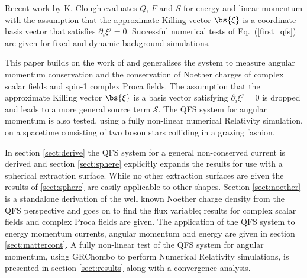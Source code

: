 Recent work by K. Clough \cite{clough2021continuity} evaluates $Q$, $F$ and $S$ for energy and linear momentum with the assumption that the approximate Killing vector $\bs{\xi}$ is a coordinate basis vector that satisfies ${\partial_i \xi^j} =0$. Successful numerical tests of Eq.~(\ref{first_qfs}) are given for fixed and dynamic background simulations.

This paper builds on the work of \cite{clough2021continuity} and generalises the system to measure angular momentum conservation and the conservation of Noether charges of complex scalar fields and spin-1 complex Proca fields. The assumption that the approximate Killing vector $\bs{\xi}$ is a basis vector satisfying $\partial_i \xi^j = 0$ is dropped and leads to a more general source term $\mathcal{S}$. The QFS system for angular momentum is also tested, using a fully non-linear numerical Relativity simulation, on a spacetime consisting of two boson stars colliding in a grazing fashion.

In section \ref{sect:derive} the QFS system for a general non-conserved current is derived and section \ref{sect:sphere} explicitly expands the results for use with a spherical extraction surface. While no other extraction surfaces are given the results of \ref{sect:sphere} are easily applicable to other shapes. Section \ref{sect:noether} is a standalone derivation of the well known Noether charge density from the QFS perspective and goes on to find the flux variable; results for complex scalar fields and complex Proca fields are given. The application of the QFS system to energy momentum currents, angular momentum and energy are given in section \ref{sect:mattercont}. A fully non-linear test of the QFS system for angular momentum, using GRChombo \cite{clough2015grchombo,Andrade2021} to perform Numerical Relativity simulations, is presented in section \ref{sect:results} along with a convergence analysis.



